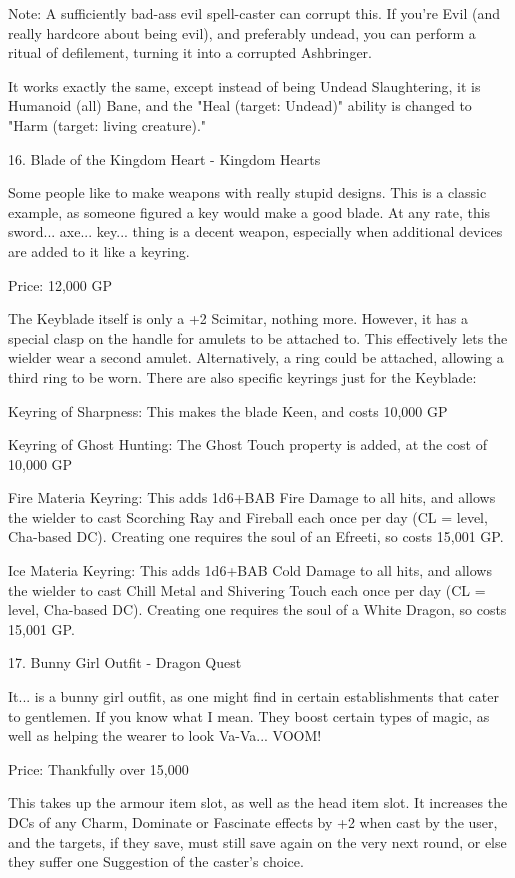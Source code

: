 \begin{multicols}{2}
Note: A sufficiently bad-ass evil spell-caster can corrupt this. If you're Evil (and really hardcore about being evil), and preferably undead, you can perform a ritual of defilement, turning it into a corrupted Ashbringer.

It works exactly the same, except instead of being Undead Slaughtering, it is Humanoid (all) Bane, and the "Heal (target: Undead)" ability is changed to "Harm (target: living creature)." 


16. Blade of the Kingdom Heart - Kingdom Hearts

Some people like to make weapons with really stupid designs. This is a classic example, as someone figured a key would make a good blade. At any rate, this sword... axe... key... thing is a decent weapon, especially when additional devices are added to it like a keyring.

Price: 12,000 GP

The Keyblade itself is only a +2 Scimitar, nothing more. However, it has a special clasp on the handle for amulets to be attached to. This effectively lets the wielder wear a second amulet. Alternatively, a ring could be attached, allowing a third ring to be worn. There are also specific keyrings just for the Keyblade:

Keyring of Sharpness: This makes the blade Keen, and costs 10,000 GP

Keyring of Ghost Hunting: The Ghost Touch property is added, at the cost of 10,000 GP

Fire Materia Keyring: This adds 1d6+BAB Fire Damage to all hits, and allows the wielder to cast Scorching Ray and Fireball each once per day (CL = level, Cha-based DC). Creating one requires the soul of an Efreeti, so costs 15,001 GP.

Ice Materia Keyring: This adds 1d6+BAB Cold Damage to all hits, and allows the wielder to cast Chill Metal and Shivering Touch each once per day (CL = level, Cha-based DC). Creating one requires the soul of a White Dragon, so costs 15,001 GP. 


17. Bunny Girl Outfit - Dragon Quest

It... is a bunny girl outfit, as one might find in certain establishments that cater to gentlemen. If you know what I mean. They boost certain types of magic, as well as helping the wearer to look Va-Va... VOOM!

Price: Thankfully over 15,000

This takes up the armour item slot, as well as the head item slot. It increases the DCs of any Charm, Dominate or Fascinate effects by +2 when cast by the user, and the targets, if they save, must still save again on the very next round, or else they suffer one Suggestion of the caster's choice.


\end{multicols}
